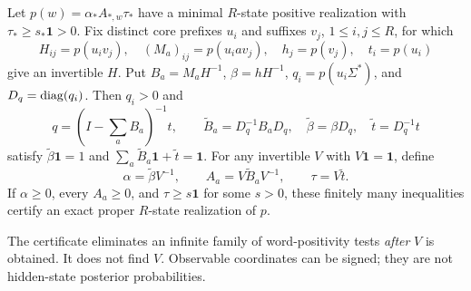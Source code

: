 \begin{theorem}
\label{II:U:thm:observable-certificate}
Let $p(w)=\alpha_*A_{*,w}\tau_*$ have a minimal $R$-state positive
realization with $\tau_*\ge s_*\mathbf1>0$. Fix distinct core prefixes
$u_i$ and suffixes $v_j$, $1\le i,j\le R$, for which
\[
 H_{ij}=p(u_iv_j),\quad (M_a)_{ij}=p(u_iav_j),\quad
 h_j=p(v_j),\quad t_i=p(u_i)
\]
give an invertible $H$. Put $B_a=M_aH^{-1}$, $\beta=hH^{-1}$,
$q_i=p(u_i\Sigma^*)$, and $D_q=\operatorname{diag}(q_i)$. Then $q_i>0$ and
\[
 q=(I-\textstyle\sum_aB_a)^{-1}t,\qquad
 \widetilde B_a=D_q^{-1}B_aD_q,\quad
 \widetilde\beta=\beta D_q,\quad \widetilde t=D_q^{-1}t
\]
satisfy $\widetilde\beta\mathbf1=1$ and
$\sum_a\widetilde B_a\mathbf1+\widetilde t=\mathbf1$.
For any invertible $V$ with $V\mathbf1=\mathbf1$, define
\[
 \alpha=\widetilde\beta V^{-1},\qquad
 A_a=V\widetilde B_aV^{-1},\qquad \tau=V\widetilde t.
\]
If $\alpha\ge0$, every $A_a\ge0$, and $\tau\ge s\mathbf1$ for some
$s>0$, these finitely many inequalities certify an exact proper
$R$-state realization of $p$.
\end{theorem}

The certificate eliminates an infinite family of word-positivity tests
\emph{after} $V$ is obtained. It does not find $V$. Observable coordinates
can be signed; they are not hidden-state posterior probabilities.

